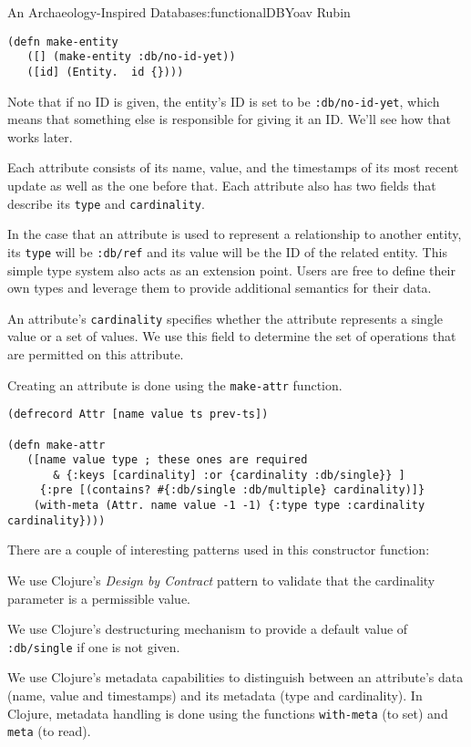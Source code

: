 \begin{aosachapter}{An Archaeology-Inspired Database}{s:functionalDB}{Yoav Rubin}
\begin{verbatim}
(defn make-entity
   ([] (make-entity :db/no-id-yet))
   ([id] (Entity.  id {})))
\end{verbatim}

Note that if no ID is given, the entity's ID is set to be
\texttt{:db/no-id-yet}, which means that something else is responsible
for giving it an ID. We'll see how that works later.

\label{attributes}

Each attribute consists of its name, value, and the timestamps of its
most recent update as well as the one before that. Each attribute also
has two fields that describe its \texttt{type} and \texttt{cardinality}.

In the case that an attribute is used to represent a relationship to
another entity, its \texttt{type} will be \texttt{:db/ref} and its value
will be the ID of the related entity. This simple type system also acts
as an extension point. Users are free to define their own types and
leverage them to provide additional semantics for their data.

An attribute's \texttt{cardinality} specifies whether the attribute
represents a single value or a set of values. We use this field to
determine the set of operations that are permitted on this attribute.

Creating an attribute is done using the \texttt{make-attr} function.

\begin{verbatim}
(defrecord Attr [name value ts prev-ts])

(defn make-attr
   ([name value type ; these ones are required
       & {:keys [cardinality] :or {cardinality :db/single}} ]
     {:pre [(contains? #{:db/single :db/multiple} cardinality)]}
    (with-meta (Attr. name value -1 -1) {:type type :cardinality cardinality})))
\end{verbatim}

There are a couple of interesting patterns used in this constructor
function:

\begin{aosaitemize}

\item
  We use Clojure's \emph{Design by Contract} pattern to validate that
  the cardinality parameter is a permissible value.
\item
  We use Clojure's destructuring mechanism to provide a default value of
  \texttt{:db/single} if one is not given.
\item
  We use Clojure's metadata capabilities to distinguish between an
  attribute's data (name, value and timestamps) and its metadata (type
  and cardinality). In Clojure, metadata handling is done using the
  functions \texttt{with-meta} (to set) and \texttt{meta} (to read).
\end{aosaitemize}


\end{aosachapter}
